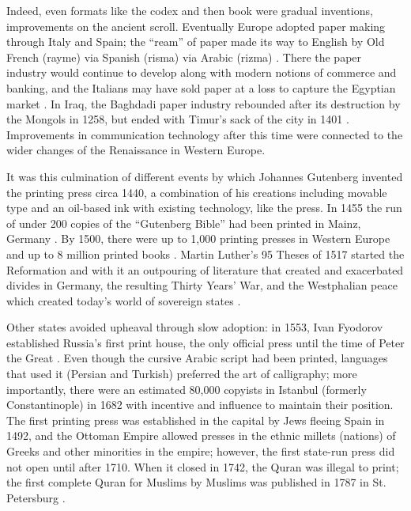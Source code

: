Indeed, even formats like the codex and then book were gradual inventions, improvements on the ancient scroll.
Eventually Europe adopted paper making through Italy and Spain; the ``ream'' of paper made its way to English by Old French (rayme) via Spanish (risma) via Arabic (rizma) \cite[p. 9]{bloom2001}.
There the paper industry would continue to develop along with modern notions of commerce and banking, and the Italians may have sold paper at a loss to capture the Egyptian market \cite[pp. 205-212]{bloom2001}.
In Iraq, the Baghdadi paper industry rebounded after its destruction by the Mongols in 1258, but ended with Timur's sack of the city in 1401 \cite[pp. 53-56]{bloom2001}.
Improvements in communication technology after this time were connected to the wider changes of the Renaissance in Western Europe.

It was this culmination of different events by which Johannes Gutenberg invented the printing press circa 1440, a combination of his creations including movable type and an oil-based ink with existing technology, like the press.
In 1455 the run of under 200 copies of the ``Gutenberg Bible'' had been printed in Mainz, Germany \cite[p. 15]{bloom2001} \cite{chaplin2005}.
By 1500, there were up to 1,000 printing presses in Western Europe and up to 8 million printed books \cite[pp. 13-17]{eisenstein2005}.
Martin Luther's 95 Theses of 1517 started the Reformation and with it an outpouring of literature that created and exacerbated divides in Germany, the resulting Thirty Years' War, and the Westphalian peace which created today's world of sovereign states \cite[ch. 6]{eisenstein2005}.

Other states avoided upheaval through slow adoption: in 1553, Ivan Fyodorov established Russia's first print house, the only official press until the time of Peter the Great \cite[pp. 95-97]{appel1987}.
Even though the cursive Arabic script had been printed, languages that used it (Persian and Turkish) preferred the art of calligraphy; more importantly, there were an estimated 80,000 copyists in Istanbul (formerly Constantinople) in 1682 with incentive and influence to maintain their position.
The first printing press was established in the capital by Jews fleeing Spain in 1492, and the Ottoman Empire allowed presses in the ethnic millets (nations) of Greeks and other minorities in the empire; however, the first state-run press did not open until after 1710. 
When it closed in 1742, the Quran was illegal to print; the first complete Quran for Muslims by Muslims was published in 1787 in St. Petersburg \cite[pp. 218-222, 10]{bloom2001}.

